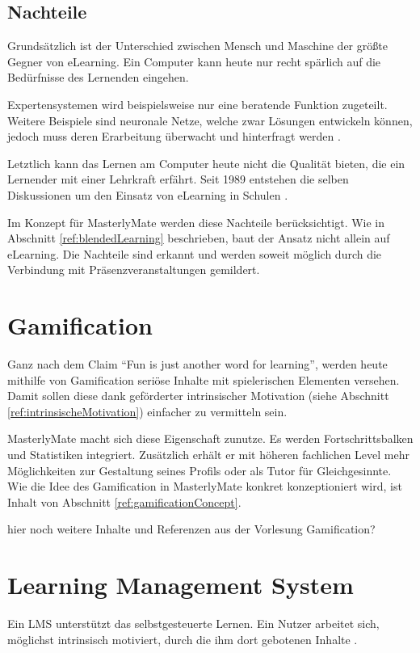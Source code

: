 \subsection{Nachteile}  
Grundsätzlich ist der Unterschied zwischen Mensch und Maschine der größte
Gegner von eLearning. Ein Computer kann heute nur recht spärlich auf die
Bedürfnisse des Lernenden eingehen. 

Expertensystemen wird beispielsweise nur eine beratende Funktion zugeteilt.
Weitere Beispiele sind neuronale Netze, welche zwar Lösungen entwickeln können,
jedoch muss deren Erarbeitung überwacht und hinterfragt werden
\cite{keller:2000}.

Letztlich kann das Lernen am Computer heute nicht die Qualität bieten, die ein
Lernender mit einer Lehrkraft erfährt. Seit 1989 entstehen die selben
Diskussionen um den Einsatz von eLearning in Schulen \cite{thome:1989}.

Im Konzept für MasterlyMate werden diese Nachteile berücksichtigt. Wie in
Abschnitt \ref{ref:blendedLearning} beschrieben, baut der Ansatz nicht allein
auf eLearning. Die Nachteile sind erkannt und werden soweit möglich durch die
Verbindung mit Präsenzveranstaltungen gemildert.

\section{Gamification}\label{ref:gamification}
Ganz nach dem Claim "`Fun is just another word for learning"'\cite{koster:2005},
werden heute mithilfe von Gamification seriöse Inhalte mit spielerischen
Elementen versehen. Damit sollen diese dank geförderter intrinsischer
Motivation (siehe Abschnitt \ref{ref:intrinsischeMotivation}) einfacher zu
vermitteln sein.

MasterlyMate macht sich diese Eigenschaft zunutze. Es werden Fortschrittsbalken
und Statistiken integriert. Zusätzlich erhält er mit höheren fachlichen Level
mehr Möglichkeiten zur Gestaltung seines Profils oder als Tutor für
Gleichgesinnte. Wie die Idee des Gamification in MasterlyMate konkret
konzeptioniert wird, ist Inhalt von Abschnitt \ref{ref:gamificationConcept}.

\begin{k}
hier noch weitere Inhalte und Referenzen aus der Vorlesung Gamification?
\end{k}

\section{Learning Management System}
Ein LMS unterstützt das selbstgesteuerte Lernen. Ein Nutzer arbeitet sich,
möglichst intrinsisch motiviert, durch die ihm dort gebotenen Inhalte
\cite{wendt:2003}.

